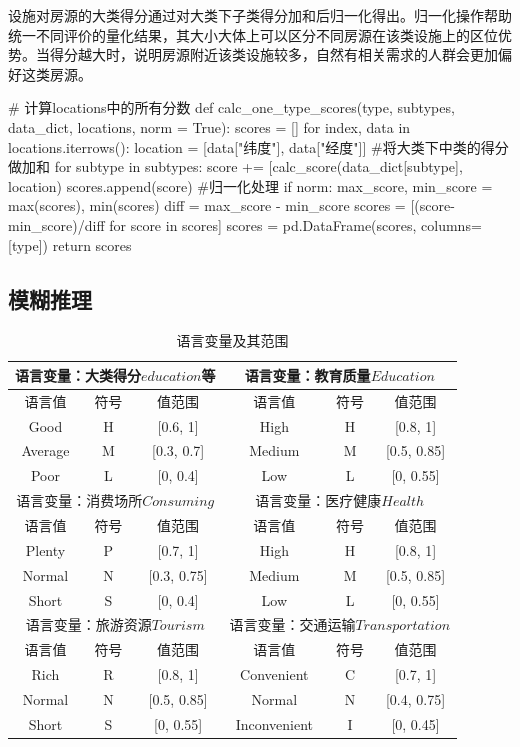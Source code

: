 \documentclass{article}
\begin{document}
设施对房源的大类得分通过对大类下子类得分加和后归一化得出。归一化操作帮助统一不同评价的量化结果，其大小大体上可以区分不同房源在该类设施上的区位优势。当得分越大时，说明房源附近该类设施较多，自然有相关需求的人群会更加偏好这类房源。

\begin{python}
# 计算locations中的所有分数
def calc_one_type_scores(type, subtypes, data_dict, locations, norm = True): 
    scores = []
    for index, data in locations.iterrows():
        location = [data["纬度"], data["经度"]]
        #将大类下中类的得分做加和
        for subtype in subtypes:
            score += [calc_score(data_dict[subtype], location) 
        scores.append(score)
    #归一化处理
    if norm: 
        max_score, min_score = max(scores), min(scores)
        diff = max_score - min_score
        scores = [(score-min_score)/diff for score in scores]
    scores = pd.DataFrame(scores, columns=[type])
    return scores
\end{python}

\subsection{模糊推理}

\begin{table}[!ht]
\centering
\begin{tabular}{|c|c|c|c|c|c|}
\hline
\multicolumn{3}{|c|}{语言变量：大类得分$education$等} & \multicolumn{3}{|c|}{语言变量：教育质量$Education$} \\ \hline
语言值 & 符号 & 值范围 & 语言值 & 符号 & 值范围 \\ \hline
Good   & H    & [0.6, 1] & High   & H    & [0.8, 1] \\ \hline
Average& M    & [0.3, 0.7] & Medium & M    & [0.5, 0.85] \\ \hline
Poor   & L    & [0, 0.4] & Low    & L    & [0, 0.55] \\ \hline
\multicolumn{3}{|c|}{语言变量：消费场所$Consuming$} & \multicolumn{3}{|c|}{语言变量：医疗健康$Health$} \\ \hline
语言值 & 符号 & 值范围 & 语言值 & 符号 & 值范围 \\ \hline
Plenty & P    & [0.7, 1] & High   & H    & [0.8, 1] \\ \hline
Normal & N    & [0.3, 0.75] & Medium & M    & [0.5, 0.85] \\ \hline
Short  & S    & [0, 0.4] & Low    & L    & [0, 0.55] \\ \hline
\multicolumn{3}{|c|}{语言变量：旅游资源$Tourism$} & \multicolumn{3}{|c|}{语言变量：交通运输$Transportation$} \\ \hline
语言值 & 符号 & 值范围 & 语言值 & 符号 & 值范围 \\ \hline
Rich   & R    & [0.8, 1] & Convenient & C    & [0.7, 1] \\ \hline
Normal & N    & [0.5, 0.85] & Normal & N    & [0.4, 0.75] \\ \hline
Short  & S    & [0, 0.55] & Inconvenient  & I    & [0, 0.45] \\ \hline
\end{tabular}
\caption{语言变量及其范围}
\label{输出变量}
\end{table}
\end{document}
